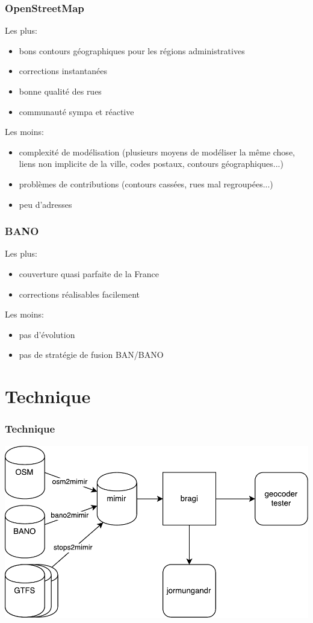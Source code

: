 \documentclass[table]{beamer}
\begin{document}
\begin{frame}
  \frametitle{OpenStreetMap}

  Les plus:
  \begin{itemize}
  \item bons contours géographiques pour les régions administratives
  \item corrections instantanées
  \item bonne qualité des rues
  \item communauté sympa et réactive
  \end{itemize}

  Les moins:
  \begin{itemize}
  \item complexité de modélisation (plusieurs moyens de modéliser la
    même chose, liens non implicite de la ville, codes postaux,
    contours géographiques...)
  \item problèmes de contributions (contours cassées, rues mal regroupées...)
  \item peu d'adresses
  \end{itemize}
\end{frame}

\begin{frame}
  \frametitle{BANO}

  Les plus:
  \begin{itemize}
  \item couverture quasi parfaite de la France
  \item corrections réalisables facilement
  \end{itemize}

  Les moins:
  \begin{itemize}
  \item pas d'évolution
  \item pas de stratégie de fusion BAN/BANO
  \end{itemize}
\end{frame}

\section{Technique}

\begin{frame}
  \frametitle{Technique}

  \centering
  \includegraphics[width=\linewidth]{images/mimirsbrunn}
\end{frame}
\end{document}
